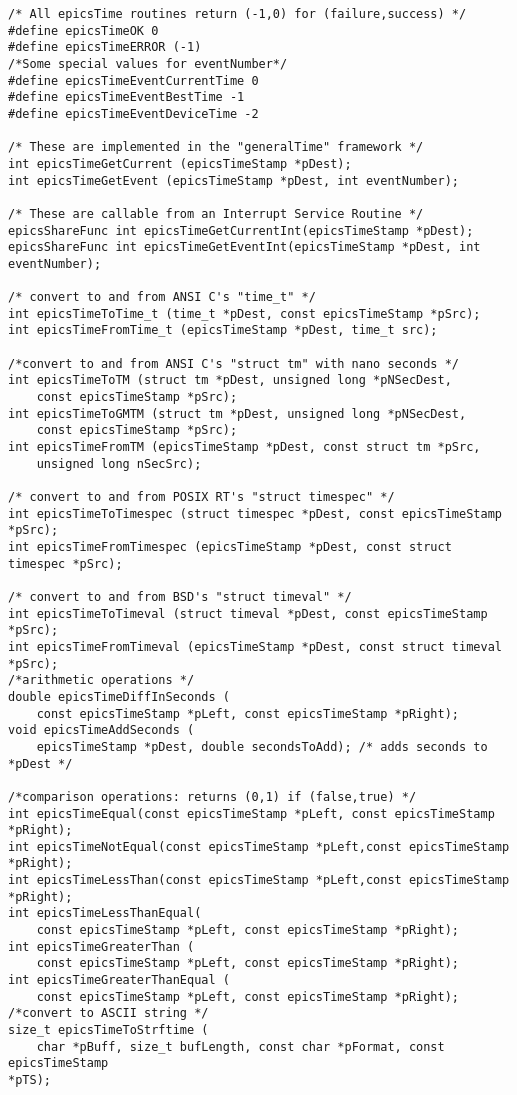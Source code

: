 \begin{verbatim}
/* All epicsTime routines return (-1,0) for (failure,success) */
#define epicsTimeOK 0
#define epicsTimeERROR (-1)
/*Some special values for eventNumber*/
#define epicsTimeEventCurrentTime 0
#define epicsTimeEventBestTime -1
#define epicsTimeEventDeviceTime -2

/* These are implemented in the "generalTime" framework */
int epicsTimeGetCurrent (epicsTimeStamp *pDest);
int epicsTimeGetEvent (epicsTimeStamp *pDest, int eventNumber);

/* These are callable from an Interrupt Service Routine */
epicsShareFunc int epicsTimeGetCurrentInt(epicsTimeStamp *pDest);
epicsShareFunc int epicsTimeGetEventInt(epicsTimeStamp *pDest, int eventNumber);

/* convert to and from ANSI C's "time_t" */
int epicsTimeToTime_t (time_t *pDest, const epicsTimeStamp *pSrc);
int epicsTimeFromTime_t (epicsTimeStamp *pDest, time_t src);

/*convert to and from ANSI C's "struct tm" with nano seconds */
int epicsTimeToTM (struct tm *pDest, unsigned long *pNSecDest,
    const epicsTimeStamp *pSrc);
int epicsTimeToGMTM (struct tm *pDest, unsigned long *pNSecDest,
    const epicsTimeStamp *pSrc);
int epicsTimeFromTM (epicsTimeStamp *pDest, const struct tm *pSrc,
    unsigned long nSecSrc);

/* convert to and from POSIX RT's "struct timespec" */
int epicsTimeToTimespec (struct timespec *pDest, const epicsTimeStamp *pSrc);
int epicsTimeFromTimespec (epicsTimeStamp *pDest, const struct timespec *pSrc);

/* convert to and from BSD's "struct timeval" */
int epicsTimeToTimeval (struct timeval *pDest, const epicsTimeStamp *pSrc);
int epicsTimeFromTimeval (epicsTimeStamp *pDest, const struct timeval *pSrc);
/*arithmetic operations */
double epicsTimeDiffInSeconds (
    const epicsTimeStamp *pLeft, const epicsTimeStamp *pRight);
void epicsTimeAddSeconds (
    epicsTimeStamp *pDest, double secondsToAdd); /* adds seconds to *pDest */

/*comparison operations: returns (0,1) if (false,true) */
int epicsTimeEqual(const epicsTimeStamp *pLeft, const epicsTimeStamp *pRight);
int epicsTimeNotEqual(const epicsTimeStamp *pLeft,const epicsTimeStamp *pRight);
int epicsTimeLessThan(const epicsTimeStamp *pLeft,const epicsTimeStamp *pRight);
int epicsTimeLessThanEqual(
    const epicsTimeStamp *pLeft, const epicsTimeStamp *pRight);
int epicsTimeGreaterThan (
    const epicsTimeStamp *pLeft, const epicsTimeStamp *pRight);
int epicsTimeGreaterThanEqual (
    const epicsTimeStamp *pLeft, const epicsTimeStamp *pRight);
/*convert to ASCII string */
size_t epicsTimeToStrftime (
    char *pBuff, size_t bufLength, const char *pFormat, const epicsTimeStamp 
*pTS);


\end{verbatim}
